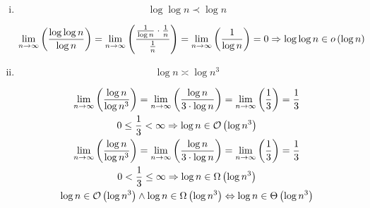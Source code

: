 \documentclass[a4paper]{scrartcl}
\begin{document}
\begin{enumerate}
\begin{enumerate}[i.]
            \item
                \begin{equation*}
                    \log \log n \prec \log n
                \end{equation*}

                \begin{equation*}
                    \lim_{n \to \infty} \left( \frac{\log \log n}{\log n} \right)
                    = \lim_{n \to \infty} \left( \frac{\frac{1}{\log n} \cdot \frac{1}{n}}{\frac{1}{n}} \right)
                    = \lim_{n \to \infty} \left( \frac{1}{\log n} \right)
                    = 0 \Rightarrow \log \log n \in o \left( \log n \right)
                \end{equation*}

            \item
                \begin{equation*}
                    \log n \asymp \log n^3
                \end{equation*}

                \begin{equation*}
                    \begin{gathered}
                        \lim_{n \to \infty} \left( \frac{\log n}{\log n^3} \right)
                        = \lim_{n \to \infty} \left( \frac{\log n}{3 \cdot \log n} \right)
                        = \lim_{n \to \infty} \left( \frac{1}{3} \right)
                        = \frac{1}{3} \\
                        0 \leq \frac{1}{3} < \infty
                        \Rightarrow \log n \in \mathcal{O} \left( \log n^3 \right)
                        \\
                        \lim_{n \to \infty} \left( \frac{\log n}{\log n^3} \right)
                        = \lim_{n \to \infty} \left( \frac{\log n}{3 \cdot \log n} \right)
                        = \lim_{n \to \infty} \left( \frac{1}{3} \right)
                        = \frac{1}{3} \\
                        0 < \frac{1}{3} \leq \infty
                        \Rightarrow \log n \in \Omega \left( \log n^3 \right)
                        \\
                        \log n \in \mathcal{O} \left( \log n^3 \right)
                        \land
                        \log n \in \Omega \left( \log n^3 \right)
                        \Leftrightarrow
                        \log n \in \Theta \left( \log n^3 \right)
                    \end{gathered}
                \end{equation*}
            

\end{enumerate}
\end{enumerate}
\end{document}

